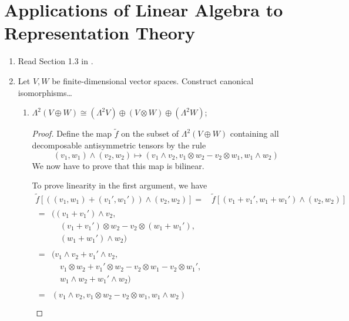 \documentclass[../psets.tex]{subfiles}
\begin{document}
\section{Applications of Linear Algebra to Representation Theory}
\begin{enumerate}
    \item {}Read Section 1.3 in \textcite{bib:FultonHarris}.
    \item Let $V,W$ be finite-dimensional vector spaces. Construct canonical isomorphisms\dots
    \begin{enumerate}
        \item $\Lambda^2(V\oplus W)\cong(\Lambda^2V)\oplus(V\otimes W)\oplus(\Lambda^2W)$;
        \begin{proof}
            Define the map $\tilde{f}$ on the subset of $\Lambda^2(V\oplus W)$ containing all decomposable antisymmetric tensors by the rule
            \begin{equation*}
                (v_1,w_1)\wedge(v_2,w_2) \mapsto (v_1\wedge v_2,v_1\otimes w_2-v_2\otimes w_1,w_1\wedge w_2)
            \end{equation*}
            We now have to prove that this map is bilinear.\par
            To prove linearity in the first argument, we have
            \begin{align*}
                \tilde{f}[((v_1,w_1)+(v_1',w_1'))\wedge(v_2,w_2)] ={}& \tilde{f}[(v_1+v_1',w_1+w_1')\wedge(v_2,w_2)]\\
                \begin{split}
                    ={}& ((v_1+v_1')\wedge v_2,\\
                    &\quad (v_1+v_1')\otimes w_2-v_2\otimes(w_1+w_1'),\\
                    &\quad (w_1+w_1')\wedge w_2)
                \end{split}\\
                \begin{split}
                    ={}& (v_1\wedge v_2+v_1'\wedge v_2,\\
                    &\quad v_1\otimes w_2+v_1'\otimes w_2-v_2\otimes w_1-v_2\otimes w_1',\\
                    &\quad w_1\wedge w_2+w_1'\wedge w_2)
                \end{split}\\
                \begin{split}
                    ={}& (v_1\wedge v_2,v_1\otimes w_2-v_2\otimes w_1,w_1\wedge w_2)\\

\end{split}
\end{align*}
\end{proof}
\end{enumerate}
\end{enumerate}
\end{document}
